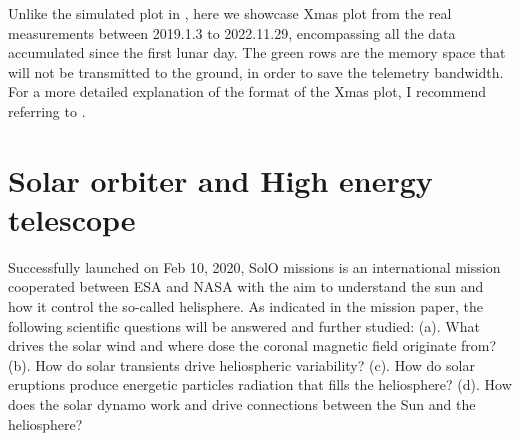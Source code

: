 Unlike the simulated plot in \citep{Wimmer2020SSRv}, here we showcase Xmas plot from the real measurements between 2019.1.3 to 2022.11.29, encompassing all the data accumulated since the first lunar day. The green rows are the memory space that will not be transmitted to the ground, in order to save the telemetry bandwidth. 
For a more detailed explanation of the format of the Xmas plot, I recommend referring to \citep{Wimmer2020SSRv}.



\section{Solar orbiter and High energy telescope}

Successfully launched on Feb 10, 2020, \ac{SolO} missions \citep{Mueller-2020-SolO} is an international mission cooperated between \ac{ESA} and \ac{NASA} with the aim to understand the sun and how it control the so-called helisphere. As indicated in the mission paper, the following scientific questions will be answered and further studied: (a). What drives the solar wind and where dose the coronal magnetic field originate from? (b). How do solar transients drive heliospheric variability? (c). How do solar eruptions produce energetic particles radiation that fills the heliosphere? (d). How does the solar dynamo work and drive connections between the Sun and the heliosphere?


